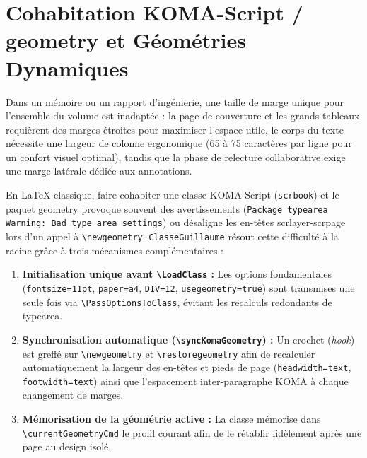 \section{Cohabitation KOMA-Script / \textsf{geometry} et Géométries Dynamiques}
\label{sec:geometries_multiples}

Dans un mémoire ou un rapport d'ingénierie, une taille de marge unique pour l'ensemble du volume est inadaptée :
la page de couverture et les grands tableaux requièrent des marges étroites pour maximiser l'espace utile, le corps du texte nécessite une largeur de colonne ergonomique (65 à 75 caractères par ligne pour un confort visuel optimal), tandis que la phase de relecture collaborative exige une marge latérale dédiée aux annotations.

En \LaTeX{} classique, faire cohabiter une classe KOMA-Script (\texttt{scrbook}) et le paquet \textsf{geometry} provoque souvent des avertissements (\texttt{Package typearea Warning: Bad type area settings}) ou désaligne les en-têtes \textsf{scrlayer-scrpage} lors d'un appel à \texttt{\textbackslash newgeometry}.
\texttt{ClasseGuillaume} résout cette difficulté à la racine grâce à trois mécanismes complémentaires :
\begin{enumerate}
  \item \textbf{Initialisation unique avant \texttt{\textbackslash LoadClass} :}
  Les options fondamentales (\texttt{fontsize=11pt}, \texttt{paper=a4}, \texttt{DIV=12}, \texttt{usegeometry=true}) sont transmises une seule fois via \texttt{\textbackslash PassOptionsToClass}, évitant les recalculs redondants de \textsf{typearea}.
  \item \textbf{Synchronisation automatique (\texttt{\textbackslash syncKomaGeometry}) :}
  Un crochet (\emph{hook}) est greffé sur \texttt{\textbackslash newgeometry} et \texttt{\textbackslash restoregeometry} afin de recalculer automatiquement la largeur des en-têtes et pieds de page (\texttt{headwidth=text}, \texttt{footwidth=text}) ainsi que l'espacement inter-paragraphe KOMA à chaque changement de marges.
  \item \textbf{Mémorisation de la géométrie active :}
  La classe mémorise dans \texttt{\textbackslash currentGeometryCmd} le profil courant afin de le rétablir fidèlement après une page au design isolé.
\end{enumerate}

